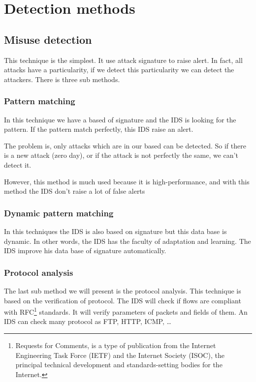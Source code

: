 \section{Detection methods}

\subsection{Misuse detection}

This technique is the simplest. It use attack signature to raise alert. In fact, all attacks have a particularity,
if we detect this particularity we can detect the attackers. There is three sub methods.

\subsubsection{Pattern matching}

In this technique we have a based of signature and the IDS is looking for the pattern. If the pattern match
perfectly, this IDS raise an alert.

The problem is, only attacks which are in our based can be detected. So if there is a new attack (zero day), or if
the attack is not perfectly the same, we can't detect it.

However, this method is much used because it is high-performance, and with this method the IDS don't raise a lot of
false alerts

\subsubsection{Dynamic pattern matching}

In this techniques the IDS is also based on signature but this data base is dynamic. In other words, the IDS has
the faculty of adaptation and learning. The IDS improve his data base of signature automatically.

\subsubsection{Protocol analysis}

The last sub method we will present is the protocol analysis. This technique is based on the verification of
protocol. The IDS will check if flows are compliant with RFC\footnote{Requests for Comments, is a type of
  publication from the Internet Engineering Task Force (IETF) and the Internet Society (ISOC), the principal
  technical development and standards-setting bodies for the Internet.} standards. It will verify parameters of
packets and fields of them. An IDS can check many protocol as FTP, HTTP, ICMP, \dots

